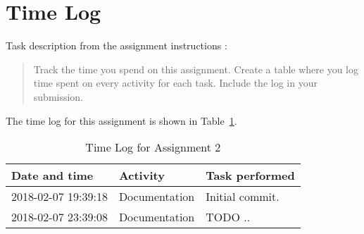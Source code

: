 %
%
%


\section{Time Log}
Task description from the assignment instructions
\cite{2dv603:assignment1-instructions}:

\begin{quote}
  Track the time you spend on this assignment. Create a table where you log
  time spent on every activity for each task. Include the log in your
  submission.
\end{quote}


The time log for this assignment is shown in Table~\ref{table-timelog}.

%
%

\begin{table}[]
  \centering
  \begin{tabular}{@{}l|l|l}
    \toprule
    Date and time       & Activity      & Task performed                            \\
    \midrule
    2018-02-07 19:39:18 & Documentation & Initial commit.                           \\
    2018-02-07 23:39:08 & Documentation & TODO ..                                   \\
    \bottomrule
  \end{tabular}
  \caption{Time Log for Assignment 2}
  \label{table-timelog}
\end{table}
